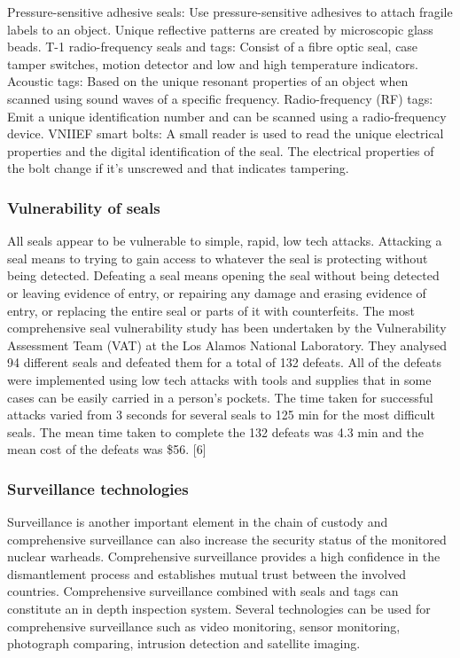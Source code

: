 \documentclass[twocolumn,a4paper]{article}
\begin{document}
Pressure-sensitive adhesive seals: Use pressure-sensitive adhesives to attach fragile labels to an
object. Unique reflective patterns are created by microscopic glass beads.
T-1 radio-frequency seals and tags: Consist of a fibre optic seal, case tamper switches, motion
detector and low and high temperature indicators.
Acoustic tags: Based on the unique resonant properties of an object when scanned using sound
waves of a specific frequency.
Radio-frequency (RF) tags: Emit a unique identification number and can be scanned using a
radio-frequency device.
VNIIEF smart bolts: A small reader is used to read the unique electrical properties and the digital
identification of the seal. The electrical properties of the bolt change if it’s unscrewed and that
indicates tampering.

\subsubsection{Vulnerability of seals}
All seals appear to be vulnerable to simple, rapid, low tech attacks. Attacking a seal means to trying
to gain access to whatever the seal is protecting without being detected. Defeating a seal means
opening the seal without being detected or leaving evidence of entry, or repairing any damage and
erasing evidence of entry, or replacing the entire seal or parts of it with counterfeits. The most
comprehensive seal vulnerability study has been undertaken by the Vulnerability Assessment Team
(VAT) at the Los Alamos National Laboratory. They analysed 94 different seals and defeated them for
a total of 132 defeats. All of the defeats were implemented using low tech attacks with tools and
supplies that in some cases can be easily carried in a person’s pockets. The time taken for successful
attacks varied from 3 seconds for several seals to 125 min for the most difficult seals. The mean time
taken to complete the 132 defeats was 4.3 min and the mean cost of the defeats was \$56. [6]

\subsubsection{Surveillance technologies}
Surveillance is another important element in the chain of custody and comprehensive surveillance
can also increase the security status of the monitored nuclear warheads. Comprehensive
surveillance provides a high confidence in the dismantlement process and establishes mutual trust
between the involved countries. Comprehensive surveillance combined with seals and tags can
constitute an in depth inspection system. Several technologies can be used for comprehensive
surveillance such as video monitoring, sensor monitoring, photograph comparing, intrusion
detection and satellite imaging. \citep{wuwen2004}
\end{document}
